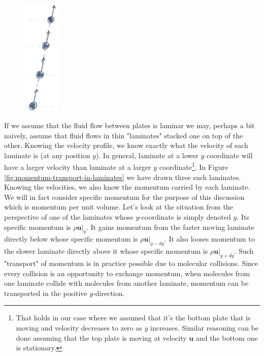 \documentclass[10pt,twocolumn]{article}
\begin{document}
\begin{figure}
\centering\includegraphics[width=1.8cm]{molecular-collisions.png}
\label{fig:molecular-collisions}
\end{figure}
If we assume that the fluid flow between plates is laminar we may, perhaps a bit naively, assume that fluid flows in thin "laminates" stacked one on top of the other. Knowing the velocity profile, we know exactly what the velocity of each laminate is (at any position $y$). In general, laminate at a lower $y$ coordinate will have a larger velocity than laminate at a larger $y$ coordinate\footnote{That holds in our case where we assumed that it's the bottom plate that is moving and velocity decreases to zero as $y$ increases. Similar reasoning can be done assuming that the top plate is moving at velocity $\mathbf{u}$ and the bottom one is stationary.}.
In Figure \ref{fig:momentum-transport-in-laminates} we have drawn three such laminates.
Knowing the velocities, we also know the momentum carried by each laminate. We will in fact consider specific momentum for the purpose of this discussion which is momentum per unit volume. Let's look at the situation from the perspective of one of the laminates whose $y$-coordinate is simply denoted $y$. Its specific momentum is $\rho \mathbf{u}|_{y}$.  It gains momentum from the faster moving laminate directly below whose specific momentum is $\rho \mathbf{u}|_{y-dy}$. It also looses momentum to the slower laminate directly above it whose specific momentum is $\rho \mathbf{u}|_{y+dy}$. Such "transport" of momentum is in practice possible due to molecular collisions. Since every collision is an opportunity to exchange momentum, when molecules from one laminate collide with molecules from another laminate, momentum can be transported in the positive $y$-direction. 
\end{document}
